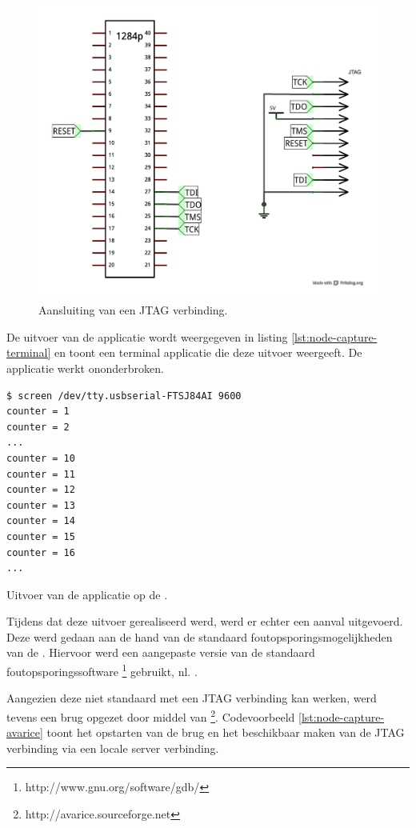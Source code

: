 \begin{figure}[ht]
  \centering
  \includegraphics[width=0.7\linewidth]{resources/node-capture-jtag.pdf}
  \caption{Aansluiting van een JTAG verbinding.}
  \label{fig:node-capture-jtag}
\end{figure}

De uitvoer van de applicatie wordt weergegeven in listing
\ref{lst:node-capture-terminal} en toont een terminal applicatie die deze
uitvoer weergeeft. De applicatie werkt ononderbroken.

\begin{listing}[ht]
  \begin{verbatim}
$ screen /dev/tty.usbserial-FTSJ84AI 9600
counter = 1
counter = 2
...
counter = 10
counter = 11
counter = 12
counter = 13
counter = 14
counter = 15
counter = 16
...
\end{verbatim}
  \caption{Uitvoer van de applicatie op de \mcu.}
  \label{lst:node-capture-terminal}
\end{listing}

Tijdens dat deze uitvoer gerealiseerd werd, werd er echter een aanval
uitgevoerd. Deze werd gedaan aan de hand van de standaard
foutopsporingsmogelijkheden van de \mcu. Hiervoor werd een aangepaste versie
van de standaard foutopsporingssoftware
\footnote{http://www.gnu.org/software/gdb/} gebruikt, nl.
.

Aangezien deze niet standaard met een JTAG verbinding kan werken, werd tevens
een brug opgezet door middel van
\footnote{http://avarice.sourceforge.net}. Codevoorbeeld
\ref{lst:node-capture-avarice} toont het opstarten van de brug en het
beschikbaar maken van de JTAG verbinding via een locale server verbinding.

